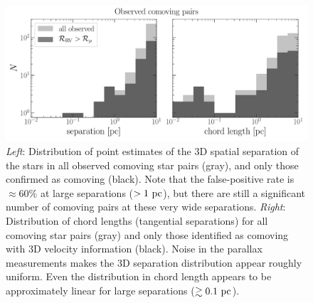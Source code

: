 \documentclass[modern, letterpaper]{aastex61}
\begin{document}
\begin{figure}[htbp]
  \begin{center}
    \includegraphics[width=\linewidth]{separation-hist.pdf}
  \end{center}
  \caption{%
    \emph{Left}: Distribution of point estimates of the 3D spatial separation of
    the stars in all observed comoving star pairs (gray), and only those
    confirmed as comoving (black).
    Note that the false-positive rate is $\approx 60\%$ at large separations
    ($>1~\mathrm{pc}$), but there are still a significant number of comoving pairs at
    these very wide separations.
    \emph{Right}: Distribution of chord lengths (tangential separations) for all
    comoving star pairs (gray) and only those identified as comoving with 3D
    velocity information (black).
    Noise in the parallax measurements makes the 3D separation distribution
    appear roughly uniform.
    Even the distribution in chord length appears to be approximately linear for
    large separations ($\gtrsim 0.1~\mathrm{pc}$).
    \label{fig:separation}}
\end{figure}
\end{document}
